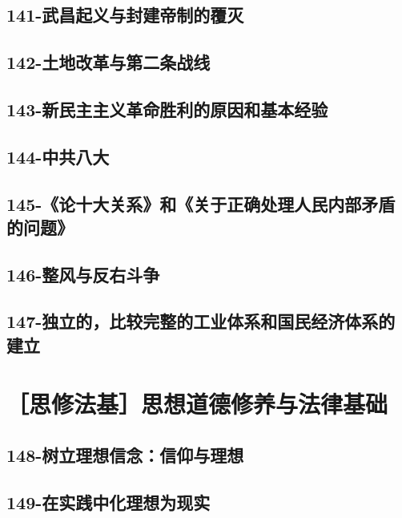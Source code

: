 \subsection{141-武昌起义与封建帝制的覆灭}

\subsection{142-土地改革与第二条战线}

\subsection{143-新民主主义革命胜利的原因和基本经验}

\subsection{144-中共八大}

\subsection{145-《论十大关系》和《关于正确处理人民内部矛盾的问题》}

\subsection{146-整风与反右斗争}

\subsection{147-独立的，比较完整的工业体系和国民经济体系的建立}



\section{［思修法基］思想道德修养与法律基础}


\subsection{148-树立理想信念：信仰与理想}

\subsection{149-在实践中化理想为现实}

